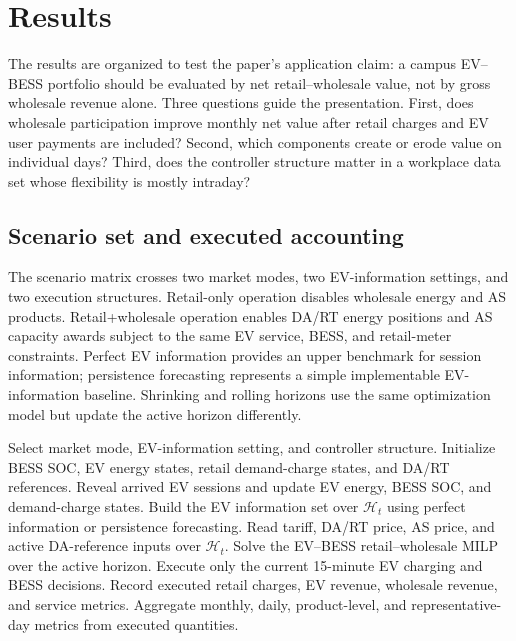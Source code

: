 \documentclass[final,5p,times]{elsarticle}
\newcommand{\calH}{\mathcal{H}}
\begin{document}
\section{Results}
\label{sec:results}

The results are organized to test the paper's application claim: a campus EV--BESS portfolio should be evaluated by net retail--wholesale value, not by gross wholesale revenue alone. Three questions guide the presentation. First, does wholesale participation improve monthly net value after retail charges and EV user payments are included? Second, which components create or erode value on individual days? Third, does the controller structure matter in a workplace data set whose flexibility is mostly intraday?

\subsection{Scenario set and executed accounting}
The scenario matrix crosses two market modes, two EV-information settings, and two execution structures. Retail-only operation disables wholesale energy and AS products. Retail+wholesale operation enables DA/RT energy positions and AS capacity awards subject to the same EV service, BESS, and retail-meter constraints. Perfect EV information provides an upper benchmark for session information; persistence forecasting represents a simple implementable EV-information baseline. Shrinking and rolling horizons use the same optimization model but update the active horizon differently.

\begin{algorithm}[!t]
\caption{Execution-aware EV--BESS simulation}
\label{alg:mpc_execution}
\begin{algorithmic}[1]
\STATE Select market mode, EV-information setting, and controller structure.
\STATE Initialize BESS SOC, EV energy states, retail demand-charge states, and DA/RT references.
    \STATE Reveal arrived EV sessions and update EV energy, BESS SOC, and demand-charge states.
    \STATE Build the EV information set over $\calH_t$ using perfect information or persistence forecasting.
    \STATE Read tariff, DA/RT price, AS price, and active DA-reference inputs over $\calH_t$.
    \STATE Solve the EV--BESS retail--wholesale MILP over the active horizon.
    \STATE Execute only the current 15-minute EV charging and BESS decisions.
    \STATE Record executed retail charges, EV revenue, wholesale revenue, and service metrics.
\ENDFOR
\STATE Aggregate monthly, daily, product-level, and representative-day metrics from executed quantities.
\end{algorithmic}
\end{algorithm}
\end{document}
